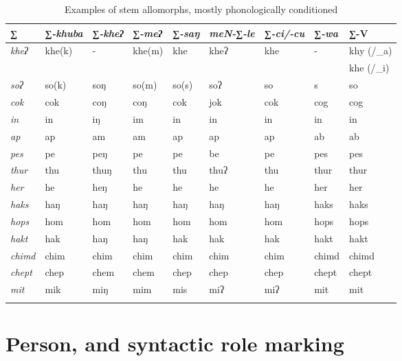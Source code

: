 	
\begin{table}[htp]
{\small
\begin{centering}
\begin{tabular}{lllllllll}
\lsptoprule
∑&∑\emph{-khuba}&∑\emph{-kheʔ}&∑\emph{-meʔ} & ∑\emph{-saŋ} & \emph{meN-∑-le}& ∑\emph{-ci/-cu}& ∑\emph{-wa}&∑-V\\
\midrule
 \emph{kheʔ} & khe(k) &-&khe(m)&khe&kheʔ&khe&-&khy (/\_a) \\%
&&&&&&&&khe (/\_i)\\
 \emph{soʔ}& so(k) &soŋ&so(m)&so(s)&soʔ&so&s&so\\  %
 \emph{cok} & cok&coŋ&coŋ&cok&jok&cok&cog&cog\\%
 \emph{in} &in & iŋ &im&in&in&in&in&in\\%
 \emph{ap}& ap&am&am&ap&ap&ap&ab&ab\\ %
 \emph{pes} & pe&peŋ&pe&pe&be&pe&pes&pes\\%
 \emph{thur}& thu&thuŋ&thu&thu&thuʔ&thu&thur&thur\\ %
 \emph{her} & he&heŋ&he&he&he&he&her&her\\%
 \emph{haks}& haŋ&haŋ&haŋ&haŋ&haŋ&haŋ&haks&haks\\ %
 \emph{hops} & hom&hom&hom&hom&hom&hom&hops&hops\\%
 \emph{hakt} & hak&haŋ&haŋ&hak&hak&hak&hakt&hakt\\%
 \emph{chimd} & chim&chim&chim&chim&chim&chim&chimd&chimd\\%
 \emph{chept} & chep&chem&chem&chep&chep&chep&chept&chept\\%
 \emph{mit} & mik&miŋ&mim&mis&miʔ&miʔ&mit&mit\\%
 \lspbottomrule
\end{tabular}
\caption{Examples of stem allomorphs, mostly phonologically conditioned}\label{tab-mph-stems}
\end{centering}
}
\end{table}



\section{Person,  and syntactic role marking}\label{verb-infl}

